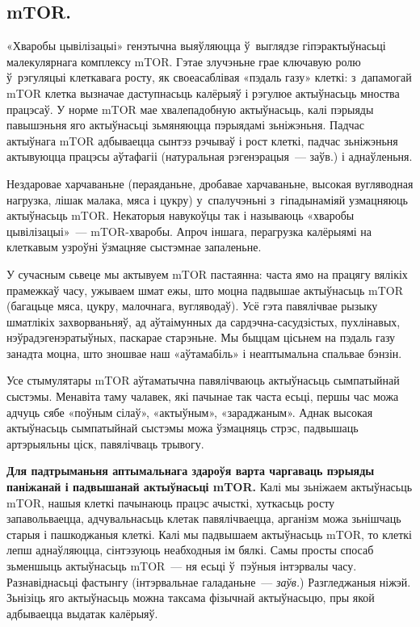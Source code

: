 \subsection*{mTOR.}

«Хваробы цывілізацыі» генэтычна выяўляюцца ў~выглядзе гіпэрактыўнасьці малекулярнага комплексу mTOR. Гэтае злучэньне грае ключавую ролю ў~рэгуляцыі клеткавага росту, як своеасаблівая «пэдаль газу» клеткі: з~дапамогай mTOR клетка вызначае даступнасьць калёрыяў і рэгулюе актыўнасьць мноства працэсаў. У норме mTOR мае хвалепадобную актыўнасьць, калі пэрыяды павышэньня яго актыўнасьці зьмяняюцца пэрыядамі зьніжэньня. Падчас актыўнага mTOR адбываецца сынтэз рэчываў і рост клеткі, падчас зьніжэньня актывуюцца працэсы аўтафагіі (натуральная рэгенэрацыя~--- заўв.) і аднаўленьня.


Нездаровае харчаваньне (пераяданьне, дробавае харчаваньне, высокая вугляводная нагрузка, лішак малака, мяса і цукру) у~спалучэньні з~гіпадынаміяй узмацняюць актыўнасьць mTOR. Некаторыя навукоўцы так і называюць «хваробы цывілізацыі»~--- mTOR-хваробы. Апроч іншага, перагрузка калёрыямі на клеткавым узроўні ўзмацняе сыстэмнае запаленьне.

У сучасным сьвеце мы актывуем mTOR пастаянна: часта ямо на працягу вялікіх прамежкаў часу, ужываем шмат ежы, што моцна падвышае актыўнасьць mTOR (багацьце мяса, цукру, малочнага, вугляводаў). Усё гэта павялічвае рызыку шматлікіх захворваньняў, ад аўтаімунных да сардэчна-сасудзістых, пухлінавых, нэўрадэгенэратыўных, паскарае старэньне. Мы быццам цісьнем на пэдаль газу занадта моцна, што зношвае наш «аўтамабіль» і неаптымальна спальвае бэнзін.

Усе стымулятары mTOR аўтаматычна павялічваюць актыўнасьць сымпатыйнай сыстэмы. Менавіта таму чалавек, які пачынае так часта есьці, першы час можа адчуць сябе «поўным сілаў», «актыўным», «зараджаным». Аднак высокая актыўнасьць сымпатыйнай сыстэмы можа ўзмацняць стрэс, падвышаць артэрыяльны ціск, павялічваць трывогу.

\textbf{Для падтрыманьня аптымальнага здароўя варта чаргаваць пэрыяды паніжанай і падвышанай актыўнасьці mTOR.} Калі мы зьніжаем актыўнасьць mTOR, нашыя клеткі пачынаюць працэс ачысткі, хуткасьць росту запавольваецца, адчувальнасьць клетак павялічваецца, арганізм можа зьнішчаць старыя і пашкоджаныя клеткі. Калі мы падвышаем актыўнасьць mTOR, то клеткі лепш аднаўляюцца, сінтэзуюць неабходныя ім бялкі. Самы просты спосаб зьменшыць актыўнасьць mTOR~--- ня есьці ў~пэўныя інтэрвалы часу. Разнавіднасьці фастынгу (інтэрвальнае галаданьне~--- \emph{заўв.}) Разгледжаныя ніжэй. Зьнізіць яго актыўнасьць можна таксама фізычнай актыўнасьцю, пры якой адбываецца выдатак калёрыяў.

